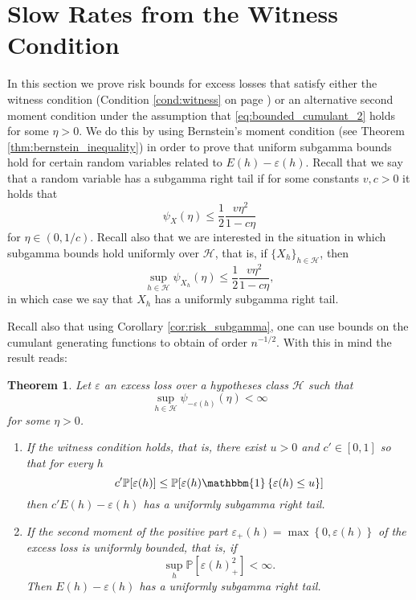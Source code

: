 \documentclass{uvamath}
\newcommand*{\calH}{\mathcal{H}}
\newcommand*{\bbP}{\mathbb{P}}
\newcommand*{\indicator}[1]{\mathbbm{1}\left\{#1\right\}}
\newcommand*{\bracks}[1]{\left\{#1\right\}}
\newtheorem{theorem}{Theorem}[section]
\theoremstyle{remark}
\theoremstyle{definition}
\theoremstyle{definition}
\theoremstyle{definition}
\theoremstyle{definition}
\theoremstyle{definition}
\begin{document}
\section{Slow Rates from the Witness
  Condition \label{section:tail_bounds}}

In this section we prove risk bounds for excess losses that satisfy
either the witness condition (Condition \ref{cond:witness} on page
\pageref{cond:witness}) or an alternative second moment condition
under the assumption that \eqref{eq:bounded_cumulant_2} holds for some
$\eta>0$. We do this by using Bernstein's moment condition (see
Theorem \ref{thm:bernstein_inequality}) in order to prove that uniform
subgamma bounds hold for certain random variables related to
$E(h) - \varepsilon(h)$.  Recall that we say that a random variable
has a subgamma right tail if for some constants $v,c>0$ it holds that
\begin{equation*}
  \psi_X(\eta)\leq \frac{1}{2}\frac{v\eta^2}{1-c\eta}
\end{equation*}
for $\eta\in(0,1/c)$. Recall also that we are interested in the
situation in which subgamma bounds hold uniformly over $\calH$, that
is, if $\{X_h\}_{h\in\calH}$, then
\begin{equation*}
  \sup_{h\in\calH} \psi_{X_h}(\eta)\leq \frac{1}{2}\frac{v\eta^2}{1-c\eta},
\end{equation*}
in which case we say that $X_h$ has a uniformly subgamma right tail.

Recall also that using Corollary \ref{cor:risk_subgamma}, one can use
bounds on the cumulant generating functions to obtain of order
$n^{-1/2}$. With this in mind the result reads:

\begin{theorem}\label{theo:cfg_bernstein_bound}
  Let $\varepsilon$ an excess loss over a hypotheses class $\calH$
  such that $$\sup_{h\in\calH}\psi_{-\varepsilon(h)}(\eta)<\infty$$
  for some $\eta>0$.
  \begin{enumerate}
  \item \label{itm:witness_condition} If the witness condition holds,
    that is, there exist $u>0$ and $c'\in[0,1]$ so that for every $h$
    \begin{equation*}
      c'\bbP[ \varepsilon(h)] \leq \bbP[ \varepsilon(h)\indicator{\varepsilon(h)\leq u}]
    \end{equation*}
    then $c'E(h)-\varepsilon(h)$ has a uniformly subgamma right tail.
  \item \label{itm:finite_moment_condition} If the second moment of
    the positive part
    $\varepsilon_+(h) = \max\bracks{0,\varepsilon(h)}$ of the excess
    loss is uniformly bounded, that is, if
    \begin{equation*}
      \sup_{h}\bbP[ \varepsilon(h)_+^2] <\infty.
    \end{equation*}
    Then $E(h)-\varepsilon(h)$ has a uniformly subgamma right tail.
  \end{enumerate}
\end{theorem}
\end{document}
